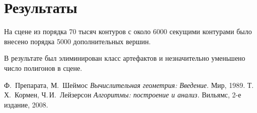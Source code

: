 \documentclass[a4paper,12pt,titlepage]{report}
\begin{document}
\section*{Результаты}
На сцене из порядка 70 тысяч контуров с около 6000 секущими контурами было внесено порядка 5000 дополнительных вершин.

В результате был элиминирован класс артефактов и незначительно уменьшено число полигонов в сцене.

\begin{thebibliography}{9}
  Ф.~Препарата, М.~Шеймос
  \emph{Вычислительная геометрия: Введение}.
  Мир,
  1989.
  Т.\,Х.~Кормен, Ч.\,И.~Лейзерсон
  \emph{Алгоритмы: построение и анализ.}
  Вильямс,
  2-е издание,
  2008.
\end{thebibliography}
\end{document}
